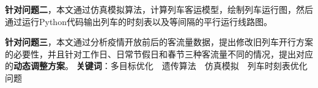 \textbf{针对问题二}，本文通过仿真模拟算法，计算列车客运模型，绘制列车运行图，然后通过运行Python代码输出列车的时刻表以及等间隔的平行运行线路图。


\textbf{针对问题三}，本文通过分析疫情开放前后的客流量数据，提出修改旧列车开行方案的必要性，并且针对工作日、日常节假日和春节三种客流量不同的情况，提出对应的\textbf{动态调整方案}。\newline
\newline
\textbf{关键词}：多目标优化　遗传算法　仿真模拟　列车时刻表优化问题



%
%

\newpage
\tableofcontents
\thispagestyle{empty}